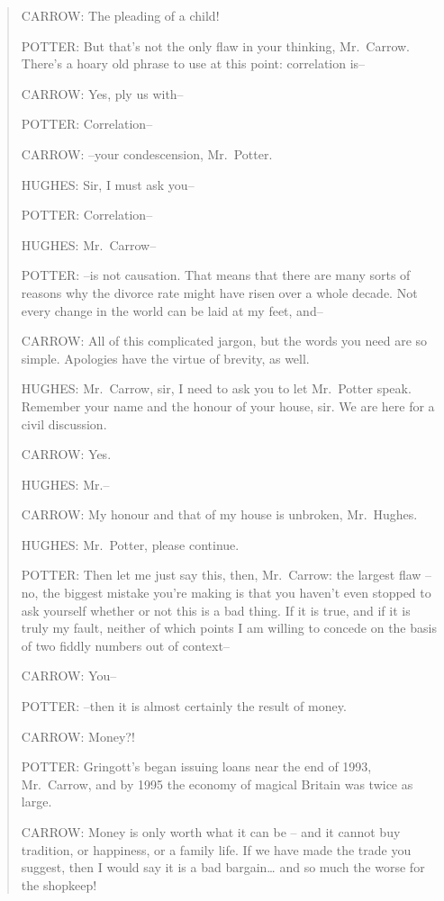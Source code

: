 \begin{quote}
{\capnums{}CARROW:} The pleading of a child!

{\capnums{}POTTER:} But that's not the only flaw in your thinking,
Mr.~Carrow. There's a hoary old phrase to use at this point: correlation
is--

{\capnums{}CARROW:} Yes, ply us with--

{\capnums{}POTTER:} Correlation--

{\capnums{}CARROW:} --your condescension, Mr.~Potter.

{\capnums{}HUGHES:} Sir, I must ask you--

{\capnums{}POTTER:} Correlation--

{\capnums{}HUGHES:} Mr.~Carrow--

{\capnums{}POTTER:} --is not causation. That means that there are many
sorts of reasons why the divorce rate might have risen over a whole
decade. Not every change in the world can be laid at my feet, and--

{\capnums{}CARROW:} All of this complicated jargon, but the words you
need are so simple. Apologies have the virtue of brevity, as well.

{\capnums{}HUGHES:} Mr.~Carrow, sir, I need to ask you to let Mr.~Potter
speak. Remember your name and the honour of your house, sir. We are here
for a civil discussion.

{\capnums{}CARROW:} Yes.

{\capnums{}HUGHES:} Mr.--

{\capnums{}CARROW:} My honour and that of my house is unbroken,
Mr.~Hughes.

{\capnums{}HUGHES:} Mr.~Potter, please continue.

{\capnums{}POTTER:} Then let me just say this, then, Mr.~Carrow: the
largest flaw -- no, the biggest mistake you're making is that you
haven't even stopped to ask yourself whether or not this is a bad thing.
If it is true, and if it is truly my fault, neither of which points I am
willing to concede on the basis of two fiddly numbers out of context--

{\capnums{}CARROW:} You--

{\capnums{}POTTER:} --then it is almost certainly the result of money.

{\capnums{}CARROW:} Money?!

{\capnums{}POTTER:} Gringott's began issuing loans near the end of 1993,
Mr.~Carrow, and by 1995 the economy of magical Britain was twice as
large.

{\capnums{}CARROW:} Money is only worth what it can be -- and it cannot
buy tradition, or happiness, or a family life. If we have made the trade
you suggest, then I would say it is a bad bargain\ldots{} and so much
the worse for the shopkeep!


\end{quote}
